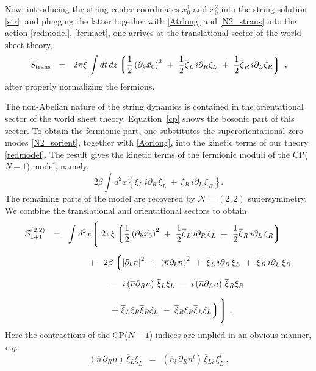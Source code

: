 \documentclass[12pt]{article}
\newcommand{\ntwot}{${\mathcal N}= \left(2,2\right) $ }
\newcommand{\p}{\partial}
\newcommand{\ov}{\overline}
\newcommand{\mc}[1]{\mathcal{#1}}
\newcommand{\lgr}{\left\lgroup}
\newcommand{\rgr}{\right\rgroup}
\def\slashed#1{\setbox0=\hbox{$#1$}             %
   \dimen0=\wd0                                 %
   \setbox1=\hbox{/} \dimen1=\wd1               %
   \ifdim\dimen0>\dimen1                        %
      \rlap{\hbox to \dimen0{\hfil/\hfil}}      %
      #1                                        %
   \else                                        %
      \rlap{\hbox to \dimen1{\hfil$#1$\hfil}}   %
      /                                         %
   \fi}                                        %
\newcommand{\bxir}{\ov{\xi}{}_R}
\newcommand{\bxil}{\ov{\xi}{}_L}
\newcommand{\xir}{\xi_R}
\newcommand{\xil}{\xi_L}
\newcommand{\nbar}{\ov{n}}
\begin{document}
	Now, introducing the string center coordinates $ x_0^1 $ and $ x_0^2 $ into the string solution \eqref{str}, and 
	plugging the latter together with \eqref{Atrlong} and \eqref{N2_strans} into the action \eqref{redmodel}, \eqref{fermact},
	one arrives at the translational sector of the world sheet theory,
\[
	S_{\rm trans} ~~=~~ 2\pi\xi\, \int dt\,dz 
                                       \lgr
					     \frac{1}{2} \left(\p_k \vec{x}_0 \right)^2
					~+~  \frac{1}{2} \ov{\zeta}{}_L\, i\p_R \zeta_L 
					~+~  \frac{1}{2} \ov{\zeta}{}_R\, i\p_L \zeta_R
				       \rgr~,
\]
	after properly normalizing the fermions.

	The non-Abelian nature of the string dynamics is contained in the orientational sector of the world sheet theory.
	Equation~\eqref{cp} shows the bosonic part of this sector. 
	To obtain the fermionic part, one substitutes the superorientational zero modes \eqref{N2_sorient}, together with
	\eqref{Aorlong}, into the kinetic terms of our theory \eqref{redmodel}.
	The result gives the kinetic terms of the fermionic moduli of the CP($N-1$) model, namely,
\[
	2\beta \int d^2x \left\{ \bxil\, i\p_R\, \xil ~+~ \bxir\, i\p_L\, \xir \right\}.
\]
	The remaining parts  of the model are recovered by \ntwot supersymmetry.
	We combine the translational and orientational sectors to obtain
\begin{align}
%
\notag
\mc{S}_{\rm 1+1}^{\rm (2,2)}  ~~=~~ 
	\int  d^2x
	\Biggl\lgroup\; 
	&
		2\pi\xi \lgr   \frac{1}{2} \left(\p_k \vec{x}_0 \right)^2
				~+~  \frac{1}{2} \ov{\zeta}{}_L\, i\p_R\, \zeta_L 
				~+~  \frac{1}{2} \ov{\zeta}{}_R\, i\p_L\, \zeta_R
			\rgr
	\\[2mm]
%
\notag
	~~+~~  
	&\;
	2\beta \lgr \left|\p_k n \right|^2  ~+~ \left(\ov{n}\p_k n\right)^2  
		~+~ \ov{\xi}{}_L\, i\p_R\, \xi_L  ~+~ \ov{\xi}{}_R\, i\p_L\,  \xi_R 
		\right . \\[2mm]
%
\label{str_ntwot}
	&\;
	~~-~
	i \left(\nbar\p_R n\right)\, \bxil\xil ~-~ i \left(\nbar\p_Ln\right) \, \bxir\xir 
	\\[2mm]
%
\notag
	&\;
	\left .
		~~+~
		\bxil \xir \bxir \xil ~-~ \bxir \xir \bxil \xil
	 \rgr
	\Biggr\rgroup ~.
\end{align}
	Here the contractions of the CP($N-1$) indices are implied in an obvious manner, {\it e.g.}
\[
	(\nbar\, \p_R n)\, \bxil\xil  ~~=~~ (\nbar_l\, \p_R n^l)\, \ov{\xi}{}_{Li}\, \xil^i~.
\]
%
%
\end{document}
